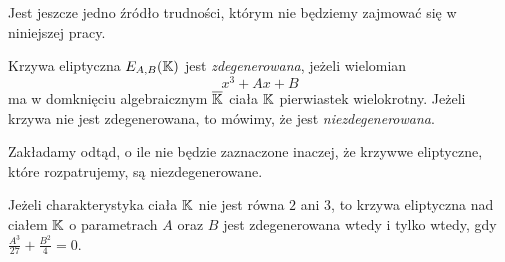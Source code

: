 Jest jeszcze jedno źródło trudności,
którym nie będziemy zajmować się w niniejszej pracy.

\begin{definition}
Krzywa eliptyczna $E_{A,B}(\mathbb{K})$ jest \emph{zdegenerowana},
jeżeli wielomian
$$x^3 + Ax + B$$
ma w domknięciu algebraicznym $\overline{\mathbb{K}}$ ciała $\mathbb{K}$
pierwiastek wielokrotny.
Jeżeli krzywa nie jest zdegenerowana,
to mówimy, że jest \emph{niezdegenerowana}.
\end{definition}

\begin{remark}
Zakładamy odtąd, o ile nie będzie zaznaczone inaczej,
że krzywwe eliptyczne, które rozpatrujemy,
są niezdegenerowane.
\end{remark}

\begin{fact}
Jeżeli charakterystyka ciała $\mathbb{K}$ nie jest równa $2$ ani $3$,
to krzywa eliptyczna nad ciałem $\mathbb{K}$ o parametrach $A$ oraz $B$
jest zdegenerowana wtedy i tylko wtedy,
gdy $\frac{A^3}{27} + \frac{B^2}{4} = 0$.
\end{fact}

